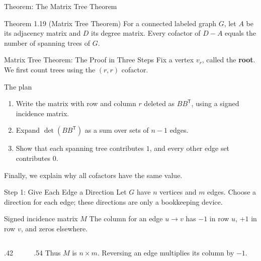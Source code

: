 \documentclass[aspectratio=169,11pt]{beamer}
\begin{document}
\begin{frame}[t]{Theorem: The Matrix Tree Theorem}
\normalsize
\large
\begin{block}{Theorem 1.19 (Matrix Tree Theorem)}
For a connected labeled graph $G$, let $A$ be its adjacency matrix and $D$ its degree matrix. Every cofactor of $D-A$ equals the number of spanning trees of $G$.
\end{block}
\end{frame}

\begin{frame}[t]{Matrix Tree Theorem: The Proof in Three Steps}
Fix a vertex $v_r$, called the \textbf{root}. We first count trees using the $(r,r)$ cofactor.
\begin{block}{The plan}
\begin{enumerate}
\item Write the matrix with row and column $r$ deleted as $BB^{\mathsf T}$, using a signed incidence matrix.
\medskip
\item Expand $\det(BB^{\mathsf T})$ as a sum over sets of $n-1$ edges.
\medskip
\item Show that each spanning tree contributes $1$, and every other edge set contributes $0$.
\end{enumerate}
\end{block}
\medskip
Finally, we explain why all cofactors have the same value.
\end{frame}

\begin{frame}[t]{Step 1: Give Each Edge a Direction}
Let $G$ have $n$ vertices and $m$ edges. Choose a direction for each edge; these directions are only a bookkeeping device.
\begin{block}{Signed incidence matrix $M$}
The column for an edge $u\longrightarrow v$ has $-1$ in row $u$, $+1$ in row $v$, and zeros elsewhere.
\end{block}
\begin{columns}[c,onlytextwidth]
\begin{column}{.42\textwidth}
\centering
{}
\end{column}
\begin{column}{.54\textwidth}
Thus $M$ is $n\times m$. Reversing an edge multiplies its column by $-1$.
\end{column}
\end{columns}
\end{frame}
\end{document}

